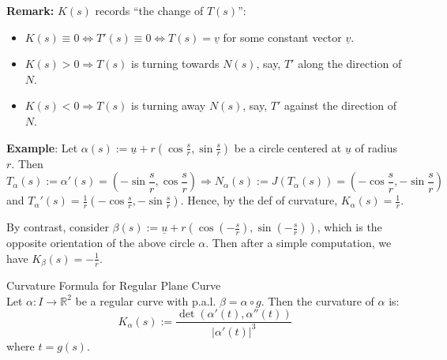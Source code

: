 \noindent\textbf{Remark:} $K(s)$ records ``the change of $T(s)$'':

\noindent\begin{itemize}
\item $K(s)\equiv 0 \iff T'(s)\equiv 0 \iff T(s) = \underline{v}$ for some constant vector $\underline{v}$.
\item $K(s) > 0 \Rightarrow T(s)$ is turning towards $N(s)$, say, $T'$ along the direction of $N$.
\item $K(s) < 0 \Rightarrow T(s)$ is turning away $N(s)$, say, $T'$ against the direction of $N$.
\end{itemize}

\noindent\textbf{Example}: Let $\alpha(s) := \underline{u} + r\left(\cos\frac{s}{r}, \sin\frac{s}{r}\right)$ be a circle centered at $\underline{u}$ of radius $r$. Then
\[
T_\alpha(s) := \alpha'(s) = \left(-\sin\frac{s}{r}, \cos\frac{s}{r}\right) \Rightarrow N_\alpha(s) := J(T_\alpha(s)) = \left(-\cos\frac{s}{r}, -\sin\frac{s}{r}\right)
\]
and $T_\alpha'(s) = \frac{1}{r}\left(-\cos\frac{s}{r}, -\sin\frac{s}{r}\right)$. Hence, by the def of curvature, $K_\alpha(s) = \frac{1}{r}$.

\noindent By contrast, consider $\beta(s) := \underline{u} + r\left(\cos(-\frac{s}{r}), \sin(-\frac{s}{r})\right)$, which is the opposite orientation of the above circle $\alpha$. Then after a simple computation, we have $K_\beta(s) = -\frac{1}{r}$.

\begin{proposition}{Curvature Formula for Regular Plane Curve}\\
Let $\alpha: I\to\mathbb{R}^2$ be a regular curve with p.a.l. $\beta = \alpha\circ g$. Then the curvature of $\alpha$ is:
\[
K_\alpha(s) := \frac{\det(\alpha'(t), \alpha''(t))}{|\alpha'(t)|^3}
\]
where $t = g(s)$.
\end{proposition}

